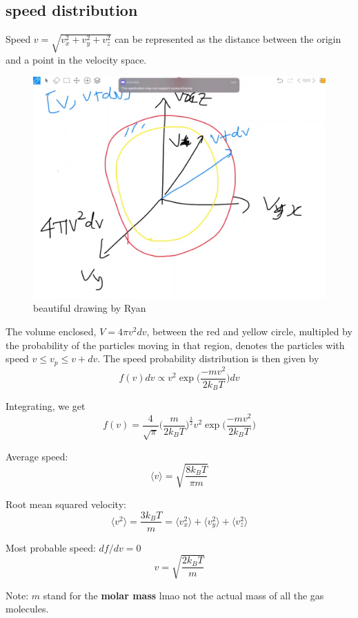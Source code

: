 \subsection{speed distribution}
Speed $v=\sqrt{v_x^2+v_y^2+v_z^2}$ can be represented as the distance between the origin and a point in the velocity space.
\begin{figure}[H]
    \centering
    \includegraphics[width=0.5\linewidth]{velocity space.png}
    \caption{beautiful drawing by Ryan}
    \label{<label>}
\end{figure}
The volume enclosed, $V=4\pi v^2 dv$, between the red and yellow circle, multipled by the probability of the particles moving in that region, denotes the particles with speed $v \leq v_p \leq v+dv$. The speed probability distribution is then given by
\begin{equation}
    f(v)dv\propto v^2 \exp \bigg({\frac{-mv^2}{2k_B T}}\bigg)dv
\end{equation}

Integrating, we get
\begin{equation}
    f(v)=\frac{4}{\sqrt{\pi}}\bigg(\frac{m}{2 k_B T}\bigg)^\frac{3}{2} v^2 \exp\bigg({\frac{-mv^2}{2k_BT}}\bigg)
\end{equation}

Average speed:
\begin{equation}
    \langle v \rangle =\sqrt{\frac{8k_BT}{\pi m}}
\end{equation}

Root mean squared velocity: 
\begin{equation}
    \langle v^2 \rangle =\frac{3k_BT}{m} = \langle v_x^2\rangle + \langle v_y^2\rangle + \langle v_z^2\rangle
\end{equation}

Most probable speed: $df/dv=0$
\begin{equation} 
    v=\sqrt{\frac{2k_BT}{m}}
\end{equation}

Note: $m$ stand for the \textbf{molar mass} lmao not the actual mass of all the gas molecules. 

